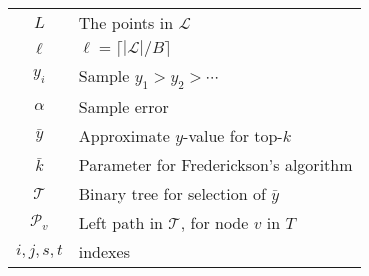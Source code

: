 \documentclass[11pt]{article}
\begin{document}
\begin{appendix}
\begin{tabular}{cl}
  $L$ & The points in $\mathcal{L}$ \\
  $\ell$ & $\ell=\lceil|\mathcal{L}|/B\rceil$ \\
  $y_i$ & Sample $y_1>y_2>\cdots$ \\
  $\alpha$ & Sample error \\
  \hline
  $\bar{y}$ & Approximate $y$-value for top-$k$ \\
  $\bar{k}$ & Parameter for Frederickson's algorithm 	\\
  $\mathcal{T}$ & Binary tree for selection of $\bar{y}$ \\
  $\mathcal{P}_v$ & Left path in $\mathcal{T}$, for node $v$ in $T$ \\
  \hline
  $i,j,s,t$ & indexes \\
\end{tabular}

\end{appendix}
\end{document}

